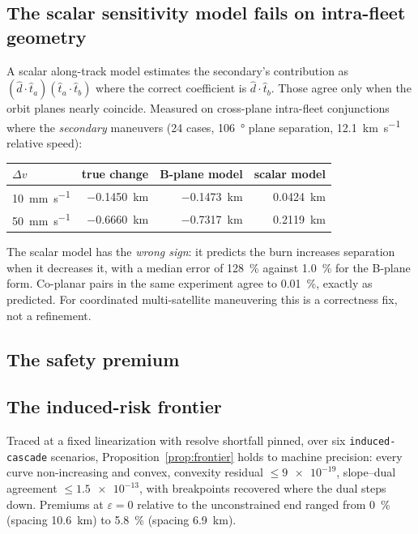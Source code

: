 \documentclass[11pt]{article}
\theoremstyle{definition}
\theoremstyle{remark}
\newcommand{\dv}{\Delta v}
\begin{document}
\subsection{The scalar sensitivity model fails on intra-fleet geometry}

A scalar along-track model estimates the secondary's contribution as
$(\hat d \cdot \hat t_a)(\hat t_a \cdot \hat t_b)$ where the correct
coefficient is $\hat d \cdot \hat t_b$. Those agree only when the orbit planes
nearly coincide. Measured on cross-plane intra-fleet conjunctions where the
\emph{secondary} maneuvers (24 cases, \SI{106}{\degree} plane separation,
\SI{12.1}{\kilo\meter\per\second} relative speed):

\begin{center}
\begin{tabular}{lrrr}
\toprule
$\dv$ & true change & B-plane model & scalar model \\
\midrule
\SI{10}{\milli\meter\per\second} & \SI{-0.1450}{\kilo\meter} & \SI{-0.1473}{\kilo\meter} & \SI{+0.0424}{\kilo\meter} \\
\SI{50}{\milli\meter\per\second} & \SI{-0.6660}{\kilo\meter} & \SI{-0.7317}{\kilo\meter} & \SI{+0.2119}{\kilo\meter} \\
\bottomrule
\end{tabular}
\end{center}

The scalar model has the \emph{wrong sign}: it predicts the burn increases
separation when it decreases it, with a median error of \SI{128}{\percent}
against \SI{1.0}{\percent} for the B-plane form. Co-planar pairs in the same
experiment agree to \SI{0.01}{\percent}, exactly as predicted. For coordinated
multi-satellite maneuvering this is a correctness fix, not a refinement.

\subsection{The safety premium}



\subsection{The induced-risk frontier}

Traced at a fixed linearization with resolve shortfall pinned, over six
\texttt{induced-cascade} scenarios, Proposition~\ref{prop:frontier} holds to
machine precision: every curve non-increasing and convex, convexity residual
$\le \num{9e-19}$, slope--dual agreement $\le \num{1.5e-13}$, with breakpoints
recovered where the dual steps down. Premiums at $\varepsilon=0$ relative to
the unconstrained end ranged from \SI{0}{\percent} (spacing
\SI{10.6}{\kilo\meter}) to \SI{5.8}{\percent} (spacing \SI{6.9}{\kilo\meter}).
\end{document}
